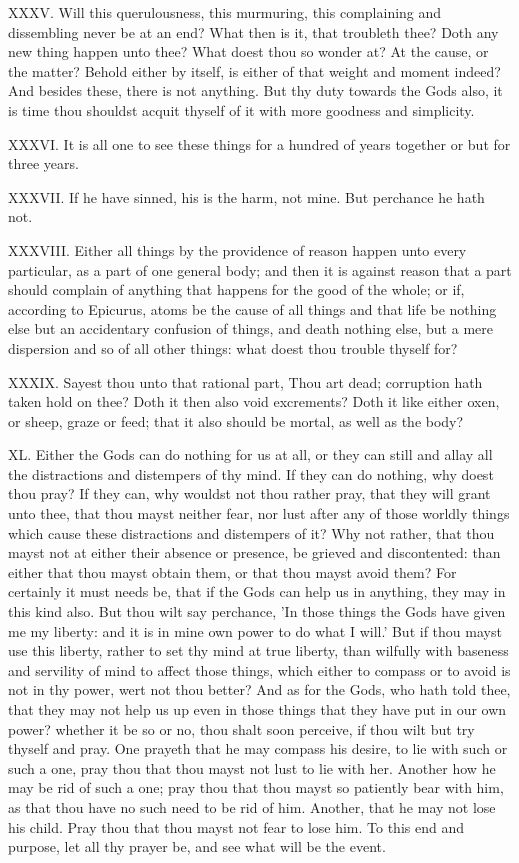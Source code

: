 XXXV. Will this querulousness, this murmuring, this complaining and
dissembling never be at an end? What then is it, that troubleth thee? Doth
any new thing happen unto thee? What doest thou so wonder at? At the
cause, or the matter? Behold either by itself, is either of that weight
and moment indeed? And besides these, there is not anything. But thy duty
towards the Gods also, it is time thou shouldst acquit thyself of it with
more goodness and simplicity.

XXXVI. It is all one to see these things for a hundred of years together
or but for three years.

XXXVII. If he have sinned, his is the harm, not mine. But perchance he
hath not.

XXXVIII. Either all things by the providence of reason happen unto every
particular, as a part of one general body; and then it is against reason
that a part should complain of anything that happens for the good of the
whole; or if, according to Epicurus, atoms be the cause of all things and
that life be nothing else but an accidentary confusion of things, and
death nothing else, but a mere dispersion and so of all other things: what
doest thou trouble thyself for?

XXXIX. Sayest thou unto that rational part, Thou art dead; corruption
hath taken hold on thee? Doth it then also void excrements? Doth it like
either oxen, or sheep, graze or feed; that it also should be mortal, as
well as the body?

XL. Either the Gods can do nothing for us at all, or they can still and
allay all the distractions and distempers of thy mind. If they can do
nothing, why doest thou pray? If they can, why wouldst not thou rather
pray, that they will grant unto thee, that thou mayst neither fear, nor
lust after any of those worldly things which cause these distractions and
distempers of it? Why not rather, that thou mayst not at either their
absence or presence, be grieved and discontented: than either that thou
mayst obtain them, or that thou mayst avoid them? For certainly it must
needs be, that if the Gods can help us in anything, they may in this kind
also. But thou wilt say perchance, 'In those things the Gods have given me
my liberty: and it is in mine own power to do what I will.' But if thou
mayst use this liberty, rather to set thy mind at true liberty, than
wilfully with baseness and servility of mind to affect those things, which
either to compass or to avoid is not in thy power, wert not thou better?
And as for the Gods, who hath told thee, that they may not help us up even
in those things that they have put in our own power? whether it be so or
no, thou shalt soon perceive, if thou wilt but try thyself and pray. One
prayeth that he may compass his desire, to lie with such or such a one,
pray thou that thou mayst not lust to lie with her. Another how he may be
rid of such a one; pray thou that thou mayst so patiently bear with him,
as that thou have no such need to be rid of him. Another, that he may not
lose his child. Pray thou that thou mayst not fear to lose him. To this
end and purpose, let all thy prayer be, and see what will be the event.

